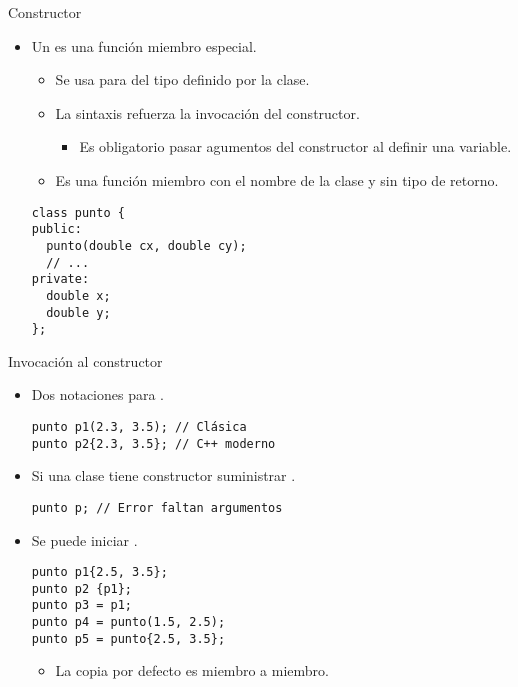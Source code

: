\begin{frame}[t,fragile]{Constructor}
\begin{itemize}
  \item Un  es una función miembro especial.
    \begin{itemize}
      \item Se usa para  del tipo definido por la clase.
      \item La sintaxis refuerza la invocación del constructor.
        \begin{itemize}
          \item Es obligatorio pasar agumentos del constructor al definir una variable.
        \end{itemize}
      \item Es una función miembro con el nombre de la clase y sin tipo de retorno.
    \end{itemize}
\begin{lstlisting}
class punto {
public:
  punto(double cx, double cy);
  // ...
private:
  double x;
  double y;
};
\end{lstlisting}
\end{itemize}
\end{frame}

\begin{frame}[t,fragile]{Invocación al constructor}
\begin{itemize}
  \item Dos notaciones para .
\begin{lstlisting}
punto p1(2.3, 3.5); // Clásica
punto p2{2.3, 3.5}; // C++ moderno
\end{lstlisting}

  \item Si una clase tiene constructor  suministrar 
        .
\begin{lstlisting}
punto p; // Error faltan argumentos
\end{lstlisting}

  \item Se puede iniciar .
\begin{lstlisting}
punto p1{2.5, 3.5};
punto p2 {p1};
punto p3 = p1;
punto p4 = punto(1.5, 2.5);
punto p5 = punto{2.5, 3.5};
\end{lstlisting}
    \begin{itemize}
      \item La copia por defecto es miembro a miembro.
    \end{itemize}
\end{itemize}
\end{frame}

